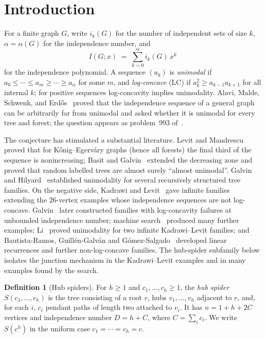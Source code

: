 \documentclass[11pt]{article}
\theoremstyle{definition}
\newtheorem{definition}[theorem]{Definition}
\begin{document}
\section{Introduction}\label{sec:intro}

For a finite graph $G$, write $i_k(G)$ for the number of independent
sets of size $k$, $\alpha=\alpha(G)$ for the independence number, and
\[
  I(G;x)\;=\;\sum_{k=0}^{\alpha} i_k(G)\,x^k
\]
for the independence polynomial.  A sequence $(a_k)$ is \emph{unimodal}
if $a_0\le\cdots\le a_m\ge\cdots\ge a_\alpha$ for some $m$, and
\emph{log-concave} (LC) if $a_k^2\ge a_{k-1}a_{k+1}$ for all internal
$k$; for positive sequences log-concavity implies unimodality.
Alavi, Malde, Schwenk, and Erd\H{o}s~\cite{AMSE87} proved that the
independence sequence of a general graph can be arbitrarily far from
unimodal and asked whether it is unimodal for every tree and forest;
the question appears as problem~993 of~\cite{ErdosProblems}.

The conjecture has stimulated a substantial literature.  Levit and
Mandrescu proved that for K\H{o}nig--Egerv\'ary graphs (hence all
forests) the final third of the sequence is nonincreasing; Basit and
Galvin~\cite{BasitGalvin} extended the decreasing zone and proved that
random labelled trees are almost surely ``almost unimodal''.
Galvin and Hilyard~\cite{GalvinHilyard} established unimodality for
several recursively structured tree families.  On the negative side,
Kadrawi and Levit~\cite{KadrawiLevit} gave infinite families extending
the $26$-vertex examples whose independence sequences are not
log-concave.  Galvin~\cite{GalvinNonLC} later constructed families with
log-concavity failures at unbounded independence number; machine
search~\cite{RamosSun} produced many further examples; Li~\cite{Li}
proved unimodality for two infinite Kadrawi--Levit families; and
Bautista-Ramos, Guill\'en-Galv\'an and G\'omez-Salgado~\cite{BautistaRamos}
developed linear recurrences and further non-log-concave families.  The
hub-spider subfamily below isolates the junction mechanism in the
Kadrawi--Levit examples and in many examples found by the search.

\begin{definition}[Hub spiders]\label{def:hub}
For $h\ge 1$ and $c_1,\dots,c_h\ge 1$, the \emph{hub spider}
$S(c_1,\dots,c_h)$ is the tree consisting of a root $r$, hubs
$v_1,\dots,v_h$ adjacent to $r$, and, for each $i$, $c_i$ pendant paths
of length two attached to $v_i$.  It has $n=1+h+2C$ vertices and
independence number $D=h+C$, where $C=\sum_i c_i$.  We write $S(c^h)$
in the uniform case $c_1=\cdots=c_h=c$.
\end{definition}
\end{document}
